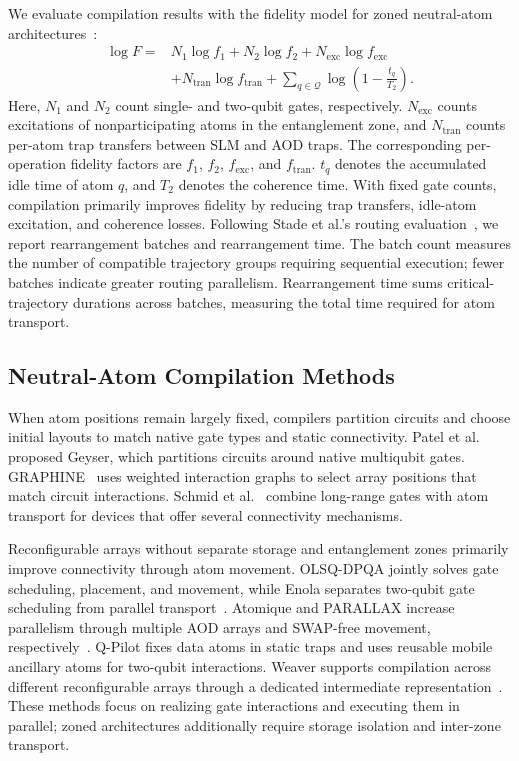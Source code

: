 We evaluate compilation results with the fidelity model for zoned neutral-atom architectures~\cite{lin2025zac}:
\begin{equation}
\begin{aligned}
\log F={}&N_1\log f_1+N_2\log f_2
+N_{\mathrm{exc}}\log f_{\mathrm{exc}}\\
&+N_{\mathrm{tran}}\log f_{\mathrm{tran}}
+\sum_{q\in\mathcal Q}\log\left(1-\frac{t_q}{T_2}\right).
\end{aligned}
\label{eq:fidelity}
\end{equation}
Here, $N_1$ and $N_2$ count single- and two-qubit gates, respectively. $N_{\mathrm{exc}}$ counts excitations of nonparticipating atoms in the entanglement zone, and $N_{\mathrm{tran}}$ counts per-atom trap transfers between SLM and AOD traps. The corresponding per-operation fidelity factors are $f_1$, $f_2$, $f_{\mathrm{exc}}$, and $f_{\mathrm{tran}}$. $t_q$ denotes the accumulated idle time of atom $q$, and $T_2$ denotes the coherence time. With fixed gate counts, compilation primarily improves fidelity by reducing trap transfers, idle-atom excitation, and coherence losses. Following Stade et al.'s routing evaluation~\cite{stade2025routingaware}, we report rearrangement batches and rearrangement time. The batch count measures the number of compatible trajectory groups requiring sequential execution; fewer batches indicate greater routing parallelism. Rearrangement time sums critical-trajectory durations across batches, measuring the total time required for atom transport.

\subsection{Neutral-Atom Compilation Methods}

When atom positions remain largely fixed, compilers partition circuits and choose initial layouts to match native gate types and static connectivity. Patel et al.~\cite{patel2022geyser} proposed Geyser, which partitions circuits around native multiqubit gates. GRAPHINE~\cite{patel2023graphine} uses weighted interaction graphs to select array positions that match circuit interactions. Schmid et al.~\cite{schmid2024hybrid} combine long-range gates with atom transport for devices that offer several connectivity mechanisms.

Reconfigurable arrays without separate storage and entanglement zones primarily improve connectivity through atom movement. OLSQ-DPQA jointly solves gate scheduling, placement, and movement, while Enola separates two-qubit gate scheduling from parallel transport~\cite{tan2022mapping,tan2024olsqdpqa,tan2025enola}. Atomique and PARALLAX increase parallelism through multiple AOD arrays and SWAP-free movement, respectively~\cite{wang2024atomique,ludmir2024parallax}. Q-Pilot fixes data atoms in static traps and uses reusable mobile ancillary atoms for two-qubit interactions. Weaver supports compilation across different reconfigurable arrays through a dedicated intermediate representation~\cite{wang2024qpilot,kirmemis2025weaver}. These methods focus on realizing gate interactions and executing them in parallel; zoned architectures additionally require storage isolation and inter-zone transport.

